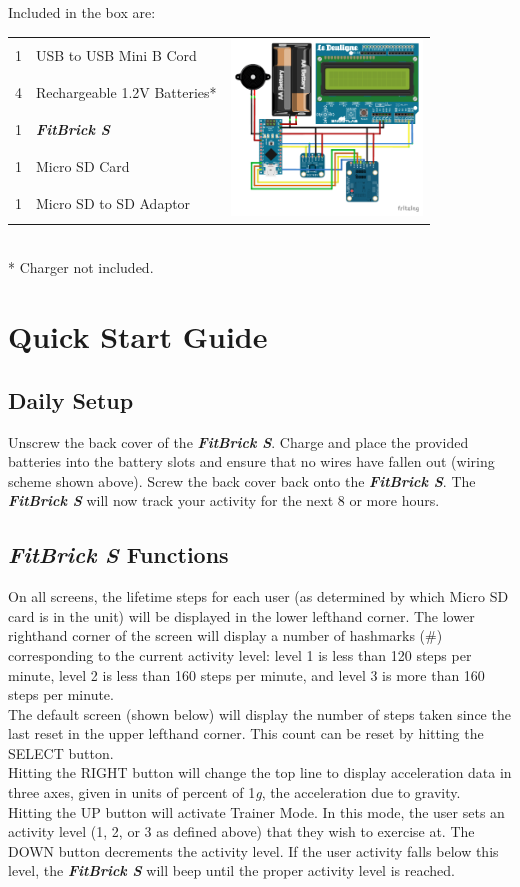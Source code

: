 \documentclass{article}
\begin{document}
Included in the box are:\\
\begin{tabular}{l l c}
	1 & USB to USB Mini B Cord & \multirow{5}{*}{\includegraphics[width=2.0in]{sketch_bb}}\\
	4 & Rechargeable 1.2V Batteries* & ~\\
	1 & \textbf{\textit{FitBrick S}} & ~\\
	1 & Micro SD Card  & ~ \\
	1 & Micro SD to SD Adaptor & ~
\end{tabular}
\\
* Charger not included.
\section{Quick Start Guide}
\subsection{Daily Setup}
Unscrew the back cover of the \textbf{\textit{FitBrick S}}. Charge and place the provided batteries into the battery slots and ensure that no wires have fallen out (wiring scheme shown above). Screw the back cover back onto the \textbf{\textit{FitBrick S}}. The \textbf{\textit{FitBrick S}} will now track your activity for the next 8 or more hours. 

\subsection{\textbf{\textit{FitBrick S}} Functions}
On all screens, the lifetime steps for each user (as determined by which Micro SD card is in the unit) will be displayed in the lower lefthand corner. The lower righthand corner of the screen will display a number of hashmarks (\#) corresponding to the current activity level: level 1 is less than 120 steps per minute, level 2 is less than 160 steps per minute, and level 3 is more than 160 steps per minute. \\
The default screen (shown below) will display the number of steps taken since the last reset in the upper lefthand corner. This count can be reset by hitting the SELECT button. \\
Hitting the RIGHT button will change the top line to display acceleration data in three axes, given in units of percent of 1\textit{g}, the acceleration due to gravity. \\
Hitting the UP button will activate Trainer Mode. In this mode, the user sets an activity level (1, 2, or 3 as defined above) that they wish to exercise at. The DOWN button decrements the activity level. If the user activity falls below this level, the \textbf{\textit{FitBrick S}} will beep until the proper activity level is reached. 
\end{document}
